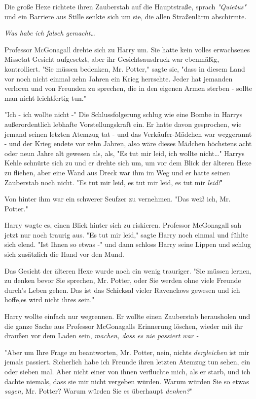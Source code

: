 {Die große Hexe richtete ihren Zauberstab auf die Hauptstraße, sprach \emph{"Quietus"} und ein Barriere aus Stille senkte sich um sie, die allen Straßenlärm abschirmte.

\emph{Was habe ich falsch gemacht…}

Professor McGonagall drehte sich zu Harry um. Sie hatte kein volles erwachsenes Missetat-Gesicht aufgesetzt, aber ihr Gesichtsausdruck war ebenmäßig, kontrolliert. "Sie müssen bedenken, Mr. Potter," sagte sie, "dass in diesem Land vor noch nicht einmal zehn Jahren ein Krieg herrschte. Jeder hat jemanden verloren und von Freunden zu sprechen, die in den eigenen Armen sterben - sollte man nicht leichtfertig tun."

"Ich - ich wollte nicht -" Die Schlussfolgerung schlug wie eine Bombe in Harrys außerordentlich lebhafte Vorstellungskraft ein. Er hatte davon gesprochen, wie jemand seinen letzten Atemzug tat - und das Verkäufer-Mädchen war weggerannt - und der Krieg endete vor zehn Jahren, also wäre dieses Mädchen höchstens acht oder neun Jahre alt gewesen als, als, "Es tut mir leid, ich wollte nicht…" Harrys Kehle schnürte sich zu und er drehte sich um, um vor dem Blick der älteren Hexe zu fliehen, aber eine Wand aus Dreck war ihm im Weg und er hatte seinen Zauberstab noch nicht. "Es tut mir leid, es tut mir leid, es tut mir \emph{leid!}"

Von hinter ihm war ein schwerer Seufzer zu vernehmen. "Das weiß ich, Mr. Potter."

Harry wagte es, einen Blick hinter sich zu riskieren. Professor McGonagall sah jetzt nur noch traurig aus. "Es tut mir leid," sagte Harry noch einmal und fühlte sich elend. "Ist Ihnen so etwas -" und dann schloss Harry seine Lippen und schlug sich zusätzlich die Hand vor den Mund.

Das Gesicht der älteren Hexe wurde noch ein wenig trauriger. "Sie müssen lernen, zu denken bevor Sie sprechen, Mr. Potter, oder Sie werden ohne viele Freunde durch's Leben gehen. Das ist das Schicksal vieler Ravenclaws gewesen und ich hoffe,es wird nicht ihres sein."

Harry wollte einfach nur wegrennen. Er wollte einen Zauberstab herausholen und die ganze Sache aus Professor McGonagalls Erinnerung löschen, wieder mit ihr draußen vor dem Laden sein, \emph{machen, dass es nie passiert war -}

"Aber um Ihre Frage zu beantworten, Mr. Potter, nein, nichts \emph{dergleichen} ist mir jemals passiert. Sicherlich habe ich Freunde ihren letzten Atemzug tun sehen, ein oder sieben mal. Aber nicht einer von ihnen verfluchte mich, als er starb, und ich dachte niemals, dass sie mir nicht vergeben würden. Warum würden Sie so etwas \emph{sagen,} Mr. Potter? Warum würden Sie es überhaupt \emph{denken?}"

}
